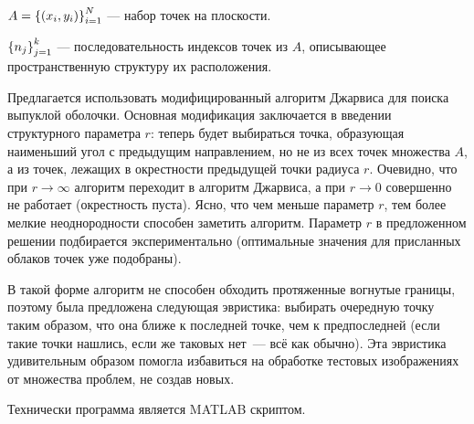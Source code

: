 






 $A = \left\{\left(x_i, y_i\right)\right\}_{i=1}^N$ --- набор точек на плоскости.

 $\left\{n_j\right\}_{j=1}^k$ --- последовательность индексов точек из $A$, описывающее пространственную структуру их расположения.

Предлагается использовать модифицированный алгоритм Джарвиса для поиска выпуклой оболочки. 
Основная модификация заключается в введении структурного параметра  $r$: теперь будет выбираться точка, образующая наименьший угол с предыдущим направлением, но не из всех точек множества $A$, а из точек, лежащих в окрестности предыдущей точки радиуса $r$. 
Очевидно, что при $r\to\infty$ алгоритм переходит в алгоритм Джарвиса, а при $r\to0$ совершенно не работает (окрестность пуста). 
Ясно, что чем меньше параметр $r$, тем более мелкие неоднородности способен заметить алгоритм.
Параметр $r$ в предложенном решении подбирается экспериментально (оптимальные значения для присланных облаков точек уже подобраны).

В такой форме алгоритм не способен обходить протяженные вогнутые границы, поэтому была предложена следующая эвристика: выбирать очередную точку таким образом, что она ближе к последней точке, чем к предпоследней (если такие точки нашлись, если же таковых нет~--- всё как обычно). 
Эта эвристика удивительным образом помогла избавиться на обработке тестовых изображениях от множества проблем, не создав новых.

Технически программа является MATLAB скриптом. 
 
